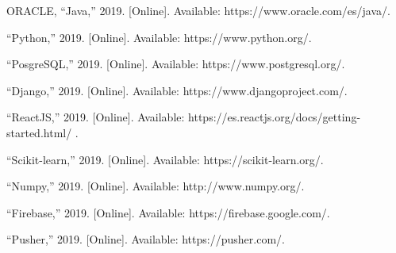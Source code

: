 \documentclass[12pt,letterpaper,openany]{book}
\begin{document}
\begin{thebibliography}{1}
 ORACLE, “Java,” 2019. [Online]. Available: https://www.oracle.com/es/java/.

 “Python,” 2019. [Online]. Available: https://www.python.org/.

 “PosgreSQL,” 2019. [Online]. Available: https://www.postgresql.org/.

 “Django,” 2019. [Online]. Available: https://www.djangoproject.com/.

 “ReactJS,” 2019. [Online]. Available: https://es.reactjs.org/docs/getting-started.html/ .

 “Scikit-learn,” 2019. [Online]. Available: https://scikit-learn.org/.

 “Numpy,” 2019. [Online]. Available: http://www.numpy.org/.

 “Firebase,” 2019. [Online]. Available: https://firebase.google.com/.

 “Pusher,” 2019. [Online]. Available: https://pusher.com/.


\end{thebibliography}
\end{document}
